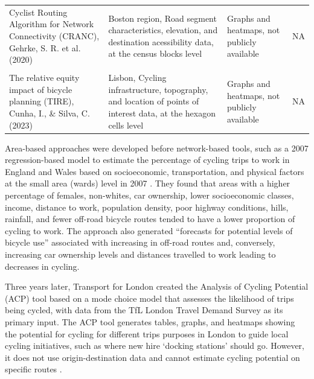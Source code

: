 \documentclass[
  super,
  preprint,
  3p]{elsarticle}
\begin{document}
\begin{longtable}[t]{>{\raggedright\arraybackslash}p{13em}>{\raggedright\arraybackslash}p{15em}>{\raggedright\arraybackslash}p{12em}>{\raggedright\arraybackslash}p{5em}}
Cyclist Routing Algorithm for Network Connectivity (CRANC), Gehrke, S. R. et al. (2020) & Boston region, Road segment characteristics, elevation, and destination acessibility data, at the census blocks level & Graphs and heatmaps, not publicly available & NA\\
\cellcolor{gray!10}{The Gross Potential for Cycling tool (CPC), Silva, C. et al. (2021 and 2022) and Lopez et al. (2021)} & \cellcolor{gray!10}{21 Portuguese cities, Land use and socio-demographic data, at the small area (census tract) level} & \cellcolor{gray!10}{Static maps showing cycling potential in different areas} & \cellcolor{gray!10}{NA}\\
The relative equity impact of bicycle planning (TIRE), Cunha, I., \& Silva, C. (2023) & Lisbon, Cycling infrastructure, topog­raphy, and location of points of interest data, at the hexagon cells level & Graphs and heatmaps, not publicly available & NA\\
\bottomrule

\end{longtable}

Area-based approaches were developed before network-based tools, such as
a 2007 regression-based model to estimate the percentage of cycling
trips to work in England and Wales based on socioeconomic,
transportation, and physical factors at the small area (wards) level in
2007 \citep{parkin_estimation_2007}. They found that areas with a higher
percentage of females, non-whites, car ownership, lower socioeconomic
classes, income, distance to work, population density, poor highway
conditions, hills, rainfall, and fewer off-road bicycle routes tended to
have a lower proportion of cycling to work. The approach also generated
``forecasts for potential levels of bicycle use'' associated with
increasing in off-road routes and, conversely, increasing car ownership
levels and distances travelled to work leading to decreases in cycling.

Three years later, Transport for London created the Analysis of Cycling
Potential (ACP) tool based on a mode choice model that assesses the
likelihood of trips being cycled, with data from the TfL London Travel
Demand Survey as its primary input. The ACP tool generates tables,
graphs, and heatmaps showing the potential for cycling for different
trips purposes in London to guide local cycling initiatives, such as
where new hire `docking stations' should go. However, it does not use
origin-destination data and cannot estimate cycling potential on
specific routes \citep{transport_for_london_analysis_2010}.
\end{document}
